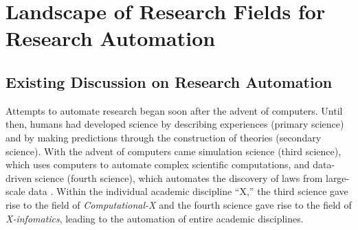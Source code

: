 \chapter{Landscape of Research Fields for Research Automation}
\label{chapter-literature-review}




\section{Existing Discussion on Research Automation}

Attempts to automate research began soon after the advent of computers. Until then, humans had developed science by describing experiences (primary science) and by making predictions through the construction of theories (secondary science). With the advent of computers came simulation science (third science), which uses computers to automate complex scientific computations, and data-driven science (fourth science), which automates the discovery of laws from large-scale data \cite{hey2009fourth}. Within the individual academic discipline ``X,'' the third science gave rise to the field of \textit{Computational-X} and the fourth science gave rise to the field of \textit{X-infomatics}, leading to the automation of entire academic disciplines.

